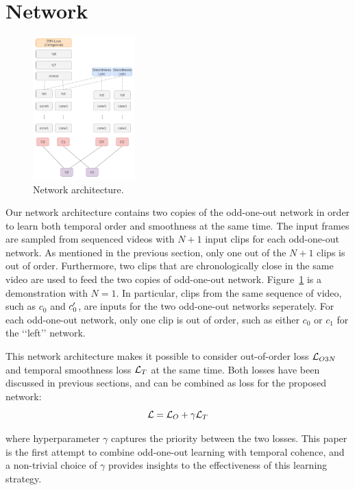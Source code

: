 \section{Network}\label{sec:network}

\begin{figure}
    \centering
    \includegraphics[width=0.35\textwidth]{images/network.png}
    \caption{Network architecture.}
    \label{fig:network}
\end{figure}

Our network architecture contains two copies of the odd-one-out network in order to learn both temporal order and smoothness at the same time. 
The input frames are sampled from sequenced videos with $N+1$ input clips for each odd-one-out network.
As mentioned in the previous section, only one out of the $N+1$ clips is out of order. 
Furthermore, two clips that are chronologically close in the same video are used to feed the two copies of odd-one-out network. 
Figure~\ref{fig:network} is a demonstration with $N=1$.
In particular, clips from the same sequence of video, such as $c_0$ and $c_0\rq{}$, are inputs for the two odd-one-out networks seperately.  
For each odd-one-out network, only one clip is out of order, such as either $c_0$ or $c_1$ for the \lq\lq{}left\rq\rq{} network.

This network architecture makes it possible to consider out-of-order loss $\mathcal{L}_{O3N}$ and temporal smoothness loss $\mathcal{L}_T$ at the same time. 
Both losses have been discussed in previous sections, and can be combined as loss for the proposed network:
\begin{equation}
\mathcal{L} = \mathcal{L}_{O} + \gamma \mathcal{L}_T    
\end{equation}

where hyperparameter $\gamma$ captures the priority between the two losses. 
This paper is the first attempt to combine odd-one-out learning with temporal cohence, and a non-trivial choice of $\gamma$ provides insights to the effectiveness of this learning strategy.